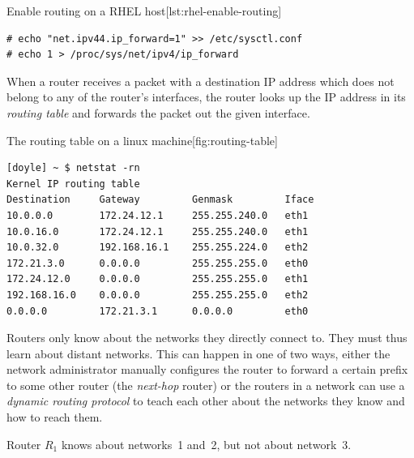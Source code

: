 \begin{fltlisting}[h!]
\begin{sidecaption}{Enable routing on a \acs{RHEL} host}[lst:rhel-enable-routing]
\begin{lstlisting}
# echo "net.ipv44.ip_forward=1" >> /etc/sysctl.conf
# echo 1 > /proc/sys/net/ipv4/ip_forward
\end{lstlisting}
\end{sidecaption}
\end{fltlisting}


When a router receives a packet with a destination \acs{IP} address which does not belong to any of the router's interfaces, the router looks up the \acs{IP} address in its \emph{routing table} and forwards the packet out the given interface.%

\begin{fltlisting}[h!]
\begin{sidecaption}{The routing table on a linux machine}[fig:routing-table]
\begin{lstlisting}
[doyle] ~ $ netstat -rn
Kernel IP routing table
Destination     Gateway         Genmask         Iface
10.0.0.0        172.24.12.1     255.255.240.0   eth1
10.0.16.0       172.24.12.1     255.255.240.0   eth1
10.0.32.0       192.168.16.1    255.255.224.0   eth2
172.21.3.0      0.0.0.0         255.255.255.0   eth0
172.24.12.0     0.0.0.0         255.255.255.0   eth1
192.168.16.0    0.0.0.0         255.255.255.0   eth2
0.0.0.0         172.21.3.1      0.0.0.0         eth0
\end{lstlisting}
\end{sidecaption}
\end{fltlisting}

Routers only know about the networks they directly connect to.
They must thus learn about distant networks.
This can happen in one of two ways, either the network administrator manually configures the router to forward a certain prefix to some other router (the \emph{next-hop} router) or the routers in a network can use a \emph{dynamic routing protocol} to teach each other about the networks they know and how to reach them.

\begin{marginfigure}
\noindent
{}
\caption{Router $R_1$ knows about networks~1 and~2, but not about network~3.}
\label{fig:ip-local-networks}
\end{marginfigure}

